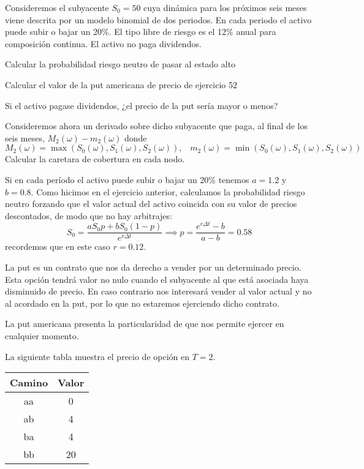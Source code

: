 \begin{problem}[2]
Consideremos el subyacente $S_0=50$ cuya dinámica para los próximos seis meses viene descrita por un modelo binomial de dos periodos. En cada periodo el activo puede subir o bajar un 20\%. El tipo libre de riesgo es el 12\% anual para composición continua. El activo no paga dividendos.

\ppart Calcular la probabilidad riesgo neutro de pasar al estado alto

\ppart Calcular el valor de la put americana de precio de ejercicio 52

\ppart Si el activo pagase dividendos, ¿el precio de la put sería mayor o menos?

\ppart Consideremos ahora un derivado sobre dicho subyacente que paga, al final de los seis meses, $M_2(ω)-m_2(ω)$ donde
\[M_2(ω)=\max(S_0(ω),S_1(ω),S_2(ω)), \;\;\; m_2(ω)=\min(S_0(ω),S_1(ω),S_2(ω))\]
Calcular la caretara de cobertura en cada nodo.

\solution


\spart

Si en cada período el activo puede subir o bajar un 20\% tenemos $a=1.2$ y $b=0.8$. Como hicimos en el ejercicio anterior, calculamos la probabilidad riesgo neutro forzando que el valor actual del activo coincida con su valor de precios descontados, de modo que no hay arbitrajes:
\[S_0 = \frac{aS_0p + bS_0(1-p)}{e^{rΔt}} \implies p = \frac{e^{rΔt}-b}{a-b} = 0.58\]
recordemos que en este caso $r=0.12$.

\spart

La put es un contrato que nos da derecho a vender por un determinado precio. Esta opción tendrá valor no nulo cuando el subyacente al que está asociada haya disminuido de precio. En caso contrario nos interesará vender al valor actual y no al acordado en la put, por lo que no estaremos ejerciendo dicho contrato.

La put americana presenta la particularidad de que nos permite ejercer en cualquier momento.

La siguiente tabla muestra el precio de opción en $T=2$.

\begin{center}
\begin{tabular}{|c|c|}
\hline
\textbf{Camino} & \textbf{Valor}\\
\hline
aa & 0 \\
ab & 4 \\
ba & 4 \\
bb & 20 \\
\hline
\end{tabular}
\end{center}


\end{problem}

